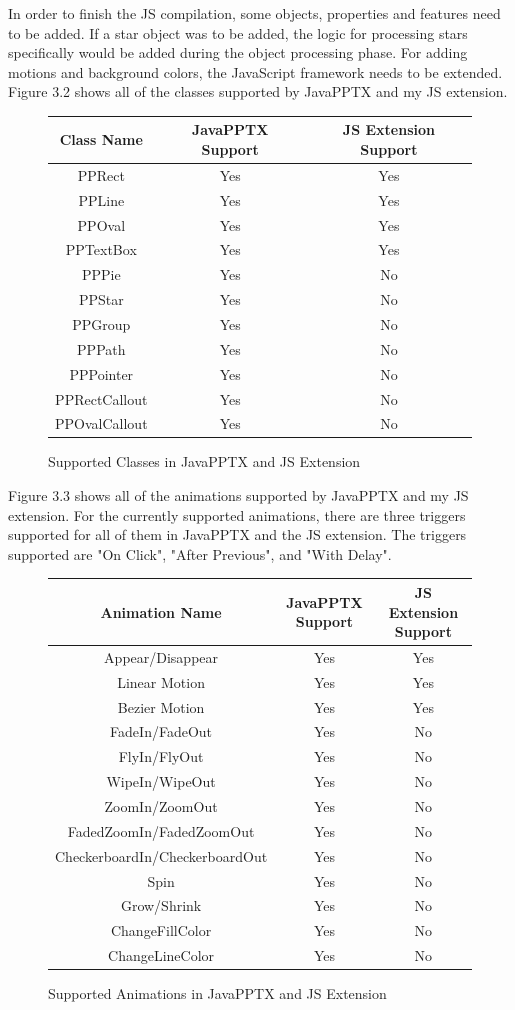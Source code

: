 \documentclass[12pt,twoside]{reedthesis}
\begin{document}
In order to finish the JS compilation, some objects, properties and features need to be added. If a star object was to be added, the logic for processing stars specifically would be added during the object processing phase. For adding motions and background colors, the JavaScript framework needs to be extended. Figure 3.2 shows all of the classes supported by JavaPPTX and my JS extension. 
\begin{figure}[htbp]
\centering
\caption{Supported Classes in JavaPPTX and JS Extension}
\begin{tabular}{|c||c|c|} 
\hline 
Class Name & JavaPPTX Support & JS Extension Support\\ 
\hline \hline
PPRect & Yes & Yes\\ 
\hline 
PPLine & Yes & Yes\\
\hline
PPOval & Yes & Yes\\
\hline
PPTextBox & Yes & Yes\\
\hline
PPPie & Yes & No\\
\hline
PPStar & Yes & No\\
\hline
PPGroup & Yes & No\\
\hline
PPPath & Yes & No\\
\hline
PPPointer & Yes & No\\
\hline
PPRectCallout & Yes & No\\
\hline
PPOvalCallout & Yes & No\\
\hline
\end{tabular}
\end{figure}
Figure 3.3 shows all of the animations supported by JavaPPTX and my JS extension. For the currently supported animations, there are three triggers supported for all of them in JavaPPTX and the JS extension. The triggers supported are "On Click", "After Previous", and "With Delay". 
\begin{figure}[htbp]
\centering
\caption{Supported Animations in JavaPPTX and JS Extension}
\begin{tabular}{|c||c|c|} 
\hline 
Animation Name & JavaPPTX Support & JS Extension Support\\ 
\hline \hline
Appear/Disappear & Yes & Yes\\ 
\hline 
Linear Motion & Yes & Yes\\
\hline
Bezier Motion & Yes & Yes\\
\hline
FadeIn/FadeOut & Yes & No\\
\hline
FlyIn/FlyOut & Yes & No\\
\hline
WipeIn/WipeOut & Yes & No\\
\hline
ZoomIn/ZoomOut & Yes & No\\
\hline
FadedZoomIn/FadedZoomOut & Yes & No\\
\hline
CheckerboardIn/CheckerboardOut & Yes & No\\
\hline
Spin & Yes & No\\
\hline
Grow/Shrink & Yes & No\\
\hline
ChangeFillColor & Yes & No\\
\hline
ChangeLineColor & Yes & No\\
\hline
\end{tabular}
\end{figure}
\end{document}
